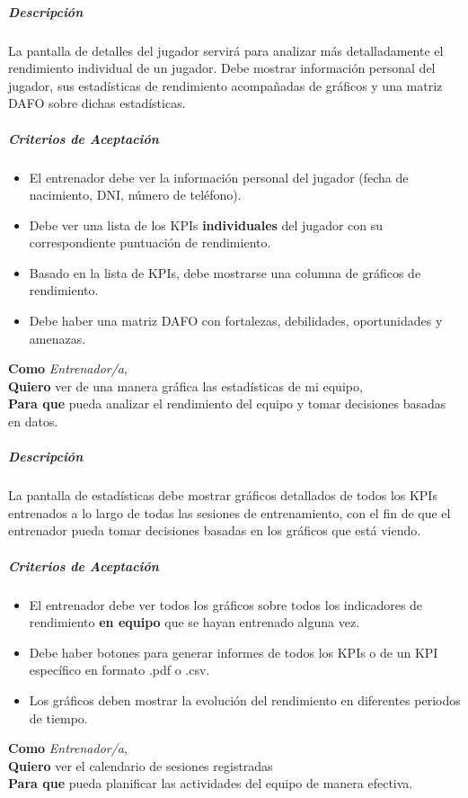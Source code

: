 \subparagraph{Descripción}
La pantalla de detalles del jugador servirá para analizar más detalladamente el rendimiento individual de un jugador. Debe mostrar información personal del jugador, sus estadísticas de rendimiento acompañadas de gráficos y una matriz DAFO sobre dichas estadísticas.

\subparagraph{Criterios de Aceptación}
\begin{itemize}
\item El entrenador debe ver la información personal del jugador (fecha de nacimiento, DNI, número de teléfono).
\item Debe ver una lista de los KPIs \textbf{individuales} del jugador con su correspondiente puntuación de rendimiento.
\item Basado en la lista de KPIs, debe mostrarse una columna de gráficos de rendimiento.
\item Debe haber una matriz DAFO con fortalezas, debilidades, oportunidades y amenazas.
\end{itemize}
\begin{tcolorbox}[title= Visualización de Estadísticas]
\textbf{Como} \textit{Entrenador/a},\\
\textbf{Quiero} ver de una manera gráfica las estadísticas de mi equipo,\\
\textbf{Para que} pueda analizar el rendimiento del equipo y tomar decisiones basadas en datos.
\end{tcolorbox}

\subparagraph{Descripción}
La pantalla de estadísticas debe mostrar gráficos detallados de todos los KPIs entrenados a lo largo de todas las sesiones de entrenamiento, con el fin de que el entrenador pueda tomar decisiones basadas en los gráficos que está viendo.

\subparagraph{Criterios de Aceptación}
\begin{itemize}
\item El entrenador debe ver todos los gráficos sobre todos los indicadores de rendimiento \textbf{en equipo} que se hayan entrenado alguna vez.
\item Debe haber botones para generar informes de todos los KPIs o de un KPI específico en formato .pdf o .csv.
\item Los gráficos deben mostrar la evolución del rendimiento en diferentes periodos de tiempo.
\end{itemize}
\begin{tcolorbox}[title= Visualización de Estadísticas]
\textbf{Como} \textit{Entrenador/a},\\
\textbf{Quiero} ver el calendario de sesiones registradas\\
\textbf{Para que} pueda planificar las actividades del equipo de manera efectiva.
\end{tcolorbox}

